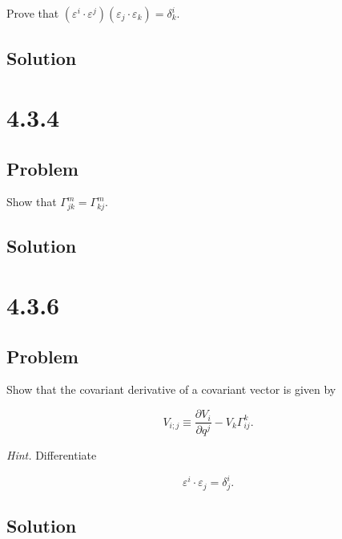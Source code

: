 \documentclass[12pt]{article}
\begin{document}
Prove that \((\varepsilon^i \cdot \varepsilon^j)(\varepsilon_j \cdot \varepsilon_k)=\delta^i_k\).

\subsection{Solution}

\newpage
\section{4.3.4}

\subsection{Problem}

Show that \(\Gamma^m_{jk}=\Gamma^m_{kj}\).

\subsection{Solution}

\section{4.3.6}

\subsection{Problem}

Show that the covariant derivative of a covariant vector is given by

\[
    V_{i;j} \equiv \frac{\partial V_i}{\partial q^j} - V_k\Gamma^k_{ij}.
\]

\textit{Hint.} Differentiate

\[
    \varepsilon^i \cdot \varepsilon_j = \delta^i_j.
\]

\subsection{Solution}

\newpage


\nocite{arfken2013mathematical}
\nocite{El-Deeb_PEU-356_Assignments}
\end{document}
